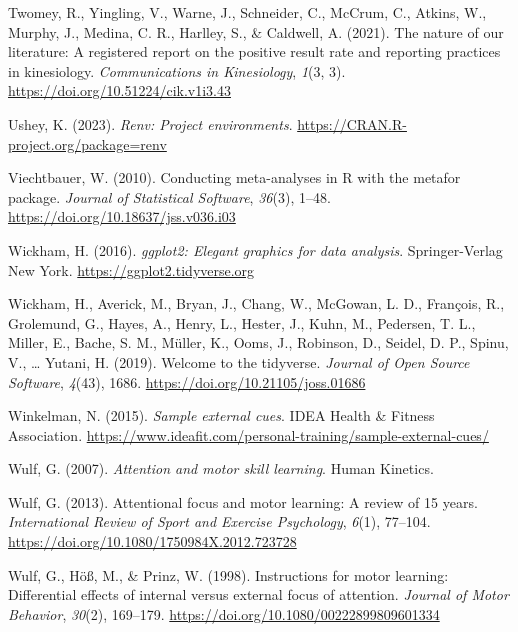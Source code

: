 \documentclass[
  man, donotrepeattitle,floatsintext]{apa7}
\newlength{\cslhangindent}
\newlength{\cslentryspacingunit} %
\newenvironment{CSLReferences}[2] %
 {%
  \setlength{\parindent}{0pt}
  \ifodd #1
  \let\oldpar\par
  \def\par{\hangindent=\cslhangindent\oldpar}
  \fi
  \setlength{\parskip}{#2\cslentryspacingunit}
 }%
 {}
\begin{document}
\begin{CSLReferences}{1}{0}
\leavevmode{}%
Twomey, R., Yingling, V., Warne, J., Schneider, C., McCrum, C., Atkins, W., Murphy, J., Medina, C. R., Harlley, S., \& Caldwell, A. (2021). The nature of our literature: {A} registered report on the positive result rate and reporting practices in kinesiology. \emph{Communications in Kinesiology}, \emph{1}(3, 3). \url{https://doi.org/10.51224/cik.v1i3.43}

\leavevmode{}%
Ushey, K. (2023). \emph{Renv: Project environments}. \url{https://CRAN.R-project.org/package=renv}

\leavevmode{}%
Viechtbauer, W. (2010). Conducting meta-analyses in {R} with the {metafor} package. \emph{Journal of Statistical Software}, \emph{36}(3), 1--48. \url{https://doi.org/10.18637/jss.v036.i03}

\leavevmode{}%
Wickham, H. (2016). \emph{ggplot2: Elegant graphics for data analysis}. Springer-Verlag New York. \url{https://ggplot2.tidyverse.org}

\leavevmode{}%
Wickham, H., Averick, M., Bryan, J., Chang, W., McGowan, L. D., François, R., Grolemund, G., Hayes, A., Henry, L., Hester, J., Kuhn, M., Pedersen, T. L., Miller, E., Bache, S. M., Müller, K., Ooms, J., Robinson, D., Seidel, D. P., Spinu, V., \ldots{} Yutani, H. (2019). Welcome to the {tidyverse}. \emph{Journal of Open Source Software}, \emph{4}(43), 1686. \url{https://doi.org/10.21105/joss.01686}

\leavevmode{}%
Winkelman, N. (2015). \emph{Sample external cues}. {IDEA Health \& Fitness Association}. \url{https://www.ideafit.com/personal-training/sample-external-cues/}

\leavevmode{}%
Wulf, G. (2007). \emph{Attention and motor skill learning}. {Human Kinetics}.

\leavevmode{}%
Wulf, G. (2013). Attentional focus and motor learning: A review of 15 years. \emph{International Review of Sport and Exercise Psychology}, \emph{6}(1), 77--104. \url{https://doi.org/10.1080/1750984X.2012.723728}

\leavevmode{}%
Wulf, G., Höß, M., \& Prinz, W. (1998). Instructions for motor learning: {Differential} effects of internal versus external focus of attention. \emph{Journal of Motor Behavior}, \emph{30}(2), 169--179. \url{https://doi.org/10.1080/00222899809601334}


\end{CSLReferences}
\end{document}
